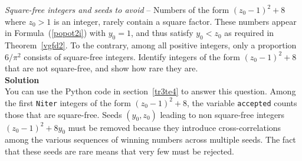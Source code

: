 \documentclass[oneside,10pt]{book}
\begin{document}
\begin{Exercise}\label{knoy54} {\em Square-free integers and seeds to avoid} -- Numbers of the form $(z_0-1)^2 +8$ where $z_0>1$ is an integer, rarely contain a square factor. These numbers  appear in Formula~(\ref{popot2i}) with $y_0=1$, and thus satisfy $y_0 < z_0$
 as required in Theorem~\ref{vgfd2}. To the contrary, among all positive integers, only a proportion $6/\pi^2$ consists of square-free
 integers. Identify integers of the form $(z_0-1)^2 +8$ that are not square-free, and show how rare they are. \vspace{1ex} \\ 
{\bf Solution} \\
 You can use the Python code in section~\ref{tr3te4} to answer this question. Among the first \texttt{Niter} integers of the form
 $(z_0-1)^2 +8$, the variable \texttt{accepted} counts those that are square-free. Seeds $(y_0,z_0)$ leading to non square-free integers $(z_0-1)^2 +8y_0$ must be removed because they introduce cross-correlations among the various sequences of winning numbers across multiple seeds. The fact that these seeds are rare means that very few must be rejected.
\end{Exercise}
\end{document}
